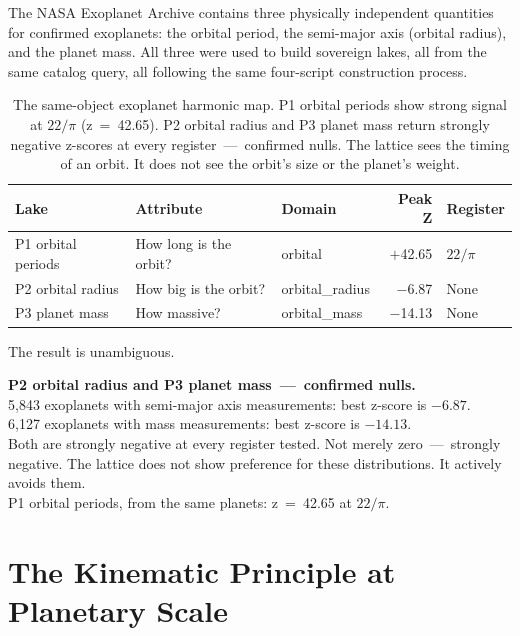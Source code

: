 \documentclass[11pt, letterpaper, openany]{book}
\begin{document}
The NASA Exoplanet Archive contains three physically independent quantities for
confirmed exoplanets: the orbital period, the semi-major axis (orbital radius), and
the planet mass. All three were used to build sovereign lakes, all from the same
catalog query, all following the same four-script construction process.

\begin{table}[H]
\centering
\renewcommand{\arraystretch}{1.6}
\begin{tabular}{|l|l|l|r|l|}
\hline
\rowcolor{kishblue!10}
\textbf{Lake} & \textbf{Attribute} & \textbf{Domain} & \textbf{Peak Z} & \textbf{Register} \\
\hline\hline
\rowcolor{signalgreen!8}
P1 orbital periods & How long is the orbit? & orbital & $+$42.65 & $22/\pi$ \\
\rowcolor{gray!8}
P2 orbital radius  & How big is the orbit?  & orbital\_radius & $-$6.87 & None \\
\rowcolor{gray!8}
P3 planet mass     & How massive?           & orbital\_mass   & $-$14.13 & None \\
\hline
\end{tabular}
\caption{The same-object exoplanet harmonic map. P1 orbital periods show strong
signal at $22/\pi$ (z~=~42.65). P2 orbital radius and P3 planet mass return
strongly negative z-scores at every register~---~confirmed nulls. The lattice sees
the timing of an orbit. It does not see the orbit's size or the planet's weight.}
\label{tab:exoplanet_map}
\end{table}

The result is unambiguous.

\begin{nullbox}
\textbf{P2 orbital radius and P3 planet mass~---~confirmed nulls.}\\[0.5em]
5,843 exoplanets with semi-major axis measurements: best z-score is $-6.87$.\\
6,127 exoplanets with mass measurements: best z-score is $-14.13$.\\[0.5em]
Both are strongly negative at every register tested. Not merely zero~---~strongly
negative. The lattice does not show preference for these distributions. It actively
avoids them.\\[0.5em]
P1 orbital periods, from the same planets: z~=~42.65 at $22/\pi$.
\end{nullbox}

\section{The Kinematic Principle at Planetary Scale}
\end{document}
